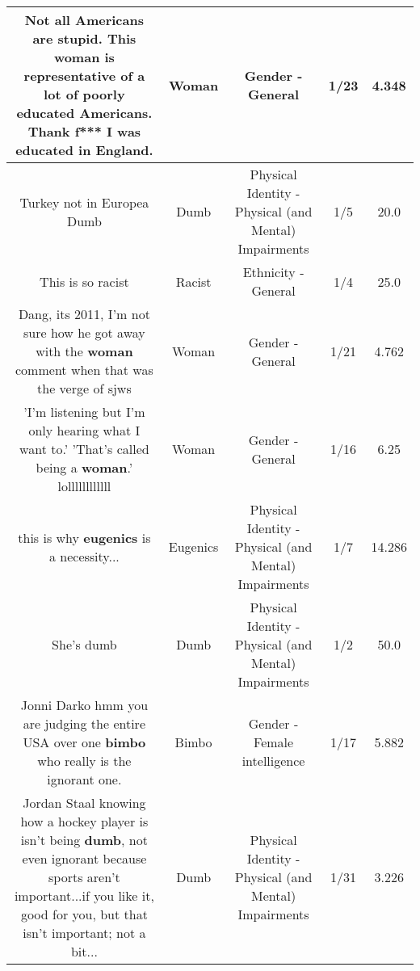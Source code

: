 \documentclass[11pt]{article}
\newlength\mylength
\begin{document}
\begin{center}
\begin{longtable}{|C{.65\mylength}|C{.30\mylength}|C{.12\mylength}|C{.12\mylength}|C{.12\mylength}|}
  \small Not all Americans are stupid. This \textbf{woman} is representative of a lot of poorly educated Americans. Thank f*** I was educated in England.\normalsize   & Woman & Gender - General & 1/23 & 4.348 \\  \hline
  \small Turkey not in Europea Dumb\normalsize   & Dumb & Physical Identity - Physical (and Mental) Impairments & 1/5 & 20.0 \\  \hline
  \small This is so racist\normalsize   & Racist & Ethnicity - General & 1/4 & 25.0 \\  \hline
  \small Dang, its 2011, I'm not sure how he got away with the \textbf{woman} comment when that was the verge of sjws\normalsize   & Woman & Gender - General & 1/21 & 4.762 \\  \hline
  \small 'I'm listening but I'm only hearing what I want to.' 'That's called being a \textbf{woman}.' lollllllllllll\normalsize   & Woman & Gender - General & 1/16 & 6.25 \\  \hline
  \small this is why \textbf{eugenics} is a necessity...\normalsize   & Eugenics & Physical Identity - Physical (and Mental) Impairments & 1/7 & 14.286 \\  \hline
  \small She's dumb\normalsize   & Dumb & Physical Identity - Physical (and Mental) Impairments & 1/2 & 50.0 \\  \hline
  \small Jonni Darko hmm you are judging the entire USA over one \textbf{bimbo} who really is the ignorant one.\normalsize   & Bimbo & Gender - Female intelligence & 1/17 & 5.882 \\  \hline
  \small Jordan Staal knowing how a hockey player is isn't being \textbf{dumb}, not even ignorant because sports aren't important...if you like it, good for you, but that isn't important; not a bit...\normalsize   & Dumb & Physical Identity - Physical (and Mental) Impairments & 1/31 & 3.226 \\  \hline

\end{longtable}
\end{center}
\end{document}
